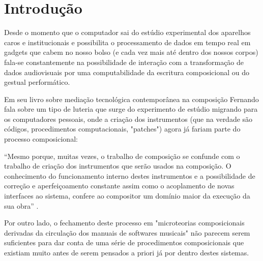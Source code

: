 \documentclass[
	12pt,				%
	openright,			%
	twoside,			%
	a4paper,			%
	english,			%
	french,				%
	spanish,			%
	brazil				%
	]{abntex2}
\begin{document}
\tableofcontents*
\cleardoublepage

%
%
%
%
%
%
%
\textual

\chapter*[Introdução]{Introdução}



Desde o momento que o computador sai do estúdio experimental dos aparelhos caros e institucionais e possibilita o processamento de dados em tempo real em gadgets que cabem no nosso bolso (e cada vez mais até dentro dos nossos corpos) fala-se constantemente na possibilidade de interação com a transformação de dados audiovisuais por uma computabilidade da escritura composicional ou do gestual performático. 

Em seu livro sobre mediação tecnológica contemporânea na composição Fernando  fala sobre um tipo de luteria que surge do experimento de estúdio migrando para os computadores pessoais, onde a criação dos instrumentos (que na verdade são códigos, procedimentos computacionais, "patches") agora já fariam parte do processo composicional:


\begin{citacao}
“Mesmo porque, muitas vezes, o trabalho de composição se confunde com o trabalho de criação dos instrumentos que serão usados na composição. O conhecimento do funcionamento interno destes instrumentos e a possibilidade de correção e aperfeiçoamento constante assim como o acoplamento de novas interfaces ao sistema, confere ao compositor um domínio maior da execução da sua obra”  \cite[p. 209]{iazzetta2009musica}.
\end{citacao}

Por outro lado, o fechamento deste processo em "microteorias composicionais derivadas da circulação dos manuais de softwares musicais"\cite[p. 152]{iazzetta2009musica} não parecem serem suficientes para dar conta de uma série de procedimentos composicionais que existiam muito antes de serem pensados a priori já por dentro destes sistemas.
\end{document}
